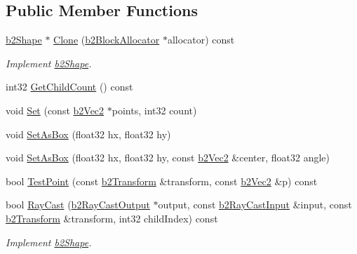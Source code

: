 \subsection*{Public Member Functions}
\begin{DoxyCompactItemize}
\item 
\mbox{\label{classb2PolygonShape_a0a15ecf0b3710e265d2a8d385d9c36f0}} 
\hyperlink{classb2Shape}{b2\+Shape} $\ast$ \hyperlink{classb2PolygonShape_a0a15ecf0b3710e265d2a8d385d9c36f0}{Clone} (\hyperlink{classb2BlockAllocator}{b2\+Block\+Allocator} $\ast$allocator) const
\begin{DoxyCompactList}\small\item\em Implement \hyperlink{classb2Shape}{b2\+Shape}. \end{DoxyCompactList}\item 
int32 \hyperlink{classb2PolygonShape_aa8fba2b51d81111b7e681768093ac197}{Get\+Child\+Count} () const
\item 
void \hyperlink{classb2PolygonShape_a4d7b35550509f570814b97325a68966b}{Set} (const \hyperlink{structb2Vec2}{b2\+Vec2} $\ast$points, int32 count)
\item 
void \hyperlink{classb2PolygonShape_a6bb90df8b4a40d1c53b64cc352a855dd}{Set\+As\+Box} (float32 hx, float32 hy)
\item 
void \hyperlink{classb2PolygonShape_a890690250115483da6c7d69829be087e}{Set\+As\+Box} (float32 hx, float32 hy, const \hyperlink{structb2Vec2}{b2\+Vec2} \&center, float32 angle)
\item 
bool \hyperlink{classb2PolygonShape_a1e70b4546c997628bbc8eeffe55c2423}{Test\+Point} (const \hyperlink{structb2Transform}{b2\+Transform} \&transform, const \hyperlink{structb2Vec2}{b2\+Vec2} \&p) const
\item 
\mbox{\label{classb2PolygonShape_a96b12c243a2ed1db4a965b93736622da}} 
bool \hyperlink{classb2PolygonShape_a96b12c243a2ed1db4a965b93736622da}{Ray\+Cast} (\hyperlink{structb2RayCastOutput}{b2\+Ray\+Cast\+Output} $\ast$output, const \hyperlink{structb2RayCastInput}{b2\+Ray\+Cast\+Input} \&input, const \hyperlink{structb2Transform}{b2\+Transform} \&transform, int32 child\+Index) const
\begin{DoxyCompactList}\small\item\em Implement \hyperlink{classb2Shape}{b2\+Shape}. \end{DoxyCompactList}\item 

\end{DoxyCompactItemize}
